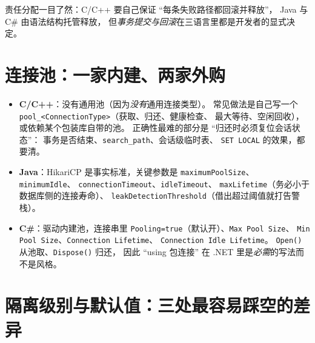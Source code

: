 \documentclass[12pt,a4paper,fontset=fandol]{ctexbook}
\newcommand{\Fn}[1]{\texttt{#1()}}
\newcommand{\Tp}[1]{\texttt{#1}}
\newcommand{\CSharp}{C\#}
\newcommand{\CppJava}{C/C++}
\begin{document}
责任分配一目了然：\CppJava{} 要自己保证 ``每条失败路径都回滚并释放''，
Java 与 \CSharp{} 由语法结构托管释放，
但\emph{事务提交与回滚}在三语言里都是开发者的显式决定。

\section{连接池：一家内建、两家外购}

\begin{itemize}
  \item \textbf{\CppJava{}}：没有通用池（因为\emph{没有}通用连接类型）。
        常见做法是自己写一个
        \texttt{pool\_<ConnectionType>}（获取、归还、健康检查、
        最大等待、空闲回收），或依赖某个包装库自带的池。
        正确性最难的部分是 ``归还时必须复位会话状态''：
        事务是否结束、\texttt{search\_path}、会话级临时表、
        \texttt{SET LOCAL} 的效果，都要清。
  \item \textbf{Java}：HikariCP 是事实标准，关键参数是
        \Tp{maximum\allowbreak{}Pool\allowbreak{}Size}、\Tp{minimumIdle}、
        \Tp{connection\allowbreak{}Timeout}、\Tp{idleTimeout}、
        \Tp{maxLifetime}（务必小于数据库侧的连接寿命）、
        \Tp{leak\allowbreak{}Detection\allowbreak{}Threshold}（借出超过阈值就打告警栈）。
  \item \textbf{\CSharp{}}：驱动内建池，连接串里
        \Tp{Pooling=true}（默认开）、\Tp{Max Pool Size}、
        \Tp{Min Pool Size}、\Tp{Connection Lifetime}、
        \Tp{Connection Idle Lifetime}。
        \Fn{Open} 从池取、\Fn{Dispose} 归还，
        因此 ``using 包连接'' 在 .NET 里是\emph{必需}的写法而不是风格。
\end{itemize}

\section{隔离级别与默认值：三处最容易踩空的差异}
\end{document}
